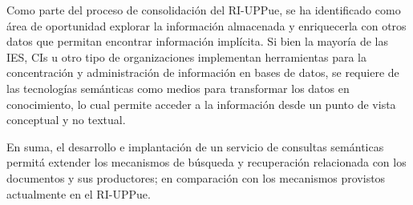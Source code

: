 Como parte del proceso de consolidaci\'on del RI-UPPue, se ha identificado como \'area de oportunidad explorar la informaci\'on almacenada y enriquecerla con otros datos que permitan encontrar informaci\'on impl\'icita. Si bien la mayor\'ia de las IES, CIs u otro tipo de organizaciones implementan herra\-mi\-en\-tas para la concentraci\'on y administraci\'on de informaci\'on en bases de datos, se requiere de las tecnolog\'ias sem\'anticas como medios para transformar los datos en conocimiento, lo cual permite acceder a la informaci\'on desde un punto de vista conceptual y no textual.

En suma, el desarrollo e implantaci\'on de un servicio de consultas sem\'anticas permit\'a extender los mecanismos de b\'usqueda y recuperaci\'on relacionada con los documentos y sus productores; en comparaci\'on con los mecanismos provistos actualmente en el RI-UPPue.


